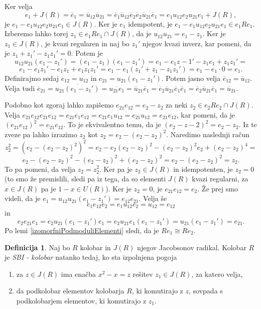\documentclass[a4paper, 12pt]{amsart}
\theoremstyle{definition} %
\newtheorem{definicija}{Definicija}[section]
\theoremstyle{plain} %
\begin{document}
Ker velja 
$$
e_1 + J(R) = \overline{e}_1 = \overline{u}_{12} \overline{u}_{21} = \overline{e}_1 \overline{u}_{12} \overline{e}_2 \overline{e}_2 \overline{u}_{21} \overline{e}_1 = e_1 u_{12} e_2 u_{21} e_1 + J(R),
$$
je $e_1 - e_1 u_{12} e_2 u_{21} e_1 \in J(R)$. Ker je $e_1$ idempotent, je  $e_1 - e_1 u_{12} e_2 u_{21} e_1 \in e_1 R e_1$. Izberemo lahko torej $z_1 \in e_1Re_1 \cap J(R)$, da je $u_{12}u_{21} = e_1 - z_1$. Ker je $z_1\in J(R)$, je kvazi regularen in naj bo $z_1'$ njegov kvazi inverz, kar pomeni, da je $z_1 + z_1' - z_1 z_1' = 0$. Potem je 
$$
u_{12} u_{21} (e_1 - z_1') = (e_1 - z_1)(e_1 - z_1') = e_1 - e_1 z-1' - z_1 e_1 + z_1 z_1' = 
$$
$$
e_1 - e_1 z_1' - e_1 z_1 + e_1 z_1 z_1' = e_ 1 - e_1 (z_1' +z_1 - z_1 z_1') = e_1  - e_1 \cdot 0 = e_1.
$$
Definirajmo sedaj $e_{12} = u_{12} $ in $e_{21} = u_{21} (e_1 - z_1')$. Potem jasno velja $\overline{e}_{12} = \overline{u}_{12}$. Velja tudi $\overline{e}_{21} = \overline{u_{21}(e_1 - z_1')} = \overline{u_{21} e_1} = \overline{u}_{21} \overline{e}_1 = \overline{e}_2 \overline{u}_{21} \overline{e}_1 \overline{e}_1 =  \overline{e}_2 \overline{u}_{21} \overline{e}_1 = \overline{u}_{21}$.

Podobno kot zgoraj lahko zapišemo $e_{21} e_{12} = e_2 - z_2 $ za neki $z_2 \in e_2 Re_2 \cap J(R)$. Velja $e_{21}e_{12}e_{21}e_{12} = e_{21} e_1 e_{12} = e_{21} e_1 u_{12} = e_{21} u_{12} = e_{21} e_{12}$, kar pomeni, da je $(e_{21} e_{12})^2 = e_{21} e_{12}$. To je ekvivalentno temu, da je $(e_2 - z-2 )^2 = e_2 - z_2$. Iz te zveze pa lahko izrazimo $z_2$ kot $z_2 = e_2 - (e_2 - z_2)^2$. Naredimo naslednji račun
$$
z_2^2 = (e_2 - (e_2 - z_2)^2)^2 = e_2 - e_2(e_2-z_2)^2 - (e_2 - z_2 )^2 e_2 + (e_2 - z_2 )^4 = 
$$
$$
e_2 - (e_2 - z_2 )^2 - (e_2 - z_2)^2 + (e_2 - z_2)^2 = e_2 - (e_2 - z_2)^2 = z_2.
$$
To pa pomeni, da velja $z_2 = z_2^2$. Ker pa je $z_2\in J(R)$ in idempotenten, je $z_2 = 0$ (to smo že premislili, sledi pa iz tega, da so elementi $J(R)$ kvazi regularni, za $x\in J(R)$ pa je $1-x\in U(R)$). Ker je $z_2 = 0$, je $e_{21} e_{12} = e_2$. Že prej smo videli, da je $e_1 = u_{12}u_{21}(e_1 - z_1') = e_{12} e_{21}$. Velja še 
$$
e_1 e_{12}e_2 = e_1 u_{12} e_2 = u_{12} = e_{12}
$$
in
$$
e_2 e_{21} e_1 = e_2 u_{21}(e_1 - z_1') e_1 = e_2 u_{21} e_1 (e_1 - z_1') = u_{21}(e_1 - z_1') = e_{21}.
$$
Po lemi \ref{izomorfniPodmoduliElementi} sledi, da je $Re_1 \cong Re_2$.

\endproof

\begin{definicija}
\label{SBI-kolobar}
Naj bo $R$ kolobar in $J(R)$ njegov Jacobsonov radikal. Kolobar $R$ je \emph{SBI - kolobar} natanko tedaj, ko sta izpolnjena pogoja
\begin{enumerate}
\item za $z\in J(R)$ ima enačba $x^2 - x = z$ rešitev $z_1 \in J(R)$, za katero velja, 
\item da podkolobar elementov kolobarja $R$, ki komutirajo z $z$, sovpada s podkolobarjem elementov, ki komutirajo z $z_1$.  
\end{enumerate}
\end{definicija}
\end{document}

